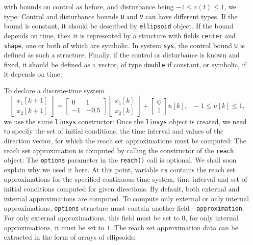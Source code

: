 \documentclass{report}
\begin{document}
with bounds on control as before, and disturbance being $-1\leq v(t)\leq1$,
we type:
Control and disturbance bounds {\tt U} and {\tt V} can have different types.
If the bound is constant, it should be described by {\tt ellipsoid} object.
If the bound depends on time, then it is represented by a structure with
fields {\tt center} and {\tt shape}, one or both of which are symbolic.
In system {\tt sys}, the control bound {\tt U} is defined as such a structure.
Finally, if the control or disturbance is known and fixed, it should be
defined as a vector, of type {\tt double} if constant, or symbolic, if
it depends on time.

To declare a discrete-time system
\[ \left[\begin{array}{c}
x_1[k+1]\\
x_2[k+1]\end{array}\right] = \left[\begin{array}{cc}
0 & 1\\
-1 & -0.5\end{array}\right]\left[\begin{array}{c}
x_1[k]\\
x_2[k]\end{array}\right] + \left[\begin{array}{c}
0\\
1\end{array}\right]u[k], ~~~ -1\leq u[k]\leq 1,\]
we use the same {\tt linsys} constructor:
Once the {\tt linsys} object is created, we need to specify the set
of initial conditions, the time interval and values of the direction vector,
for which the reach set approximations must be computed:
The reach set approximation is computed by calling the constructor
of the {\tt reach} object:
The {\tt options} parameter in the {\tt reach()} call is optional.
We shall soon explain why we used it here.
At this point, variable {\tt rs} contains the reach set approximations for the
specified continuous-time system, time interval and set of initial conditions
computed for given directions. By default, both external and internal
approximations are computed. To compute only external or only internal
approximations, {\tt options} structure must contain
another field - {\tt approximation}.
For only external approximations, this field
must be set to $0$, for only internal approximations, it must be set to $1$.
The reach set approximation data can be
extracted in the form of arrays of ellipsoids:
\end{document}
